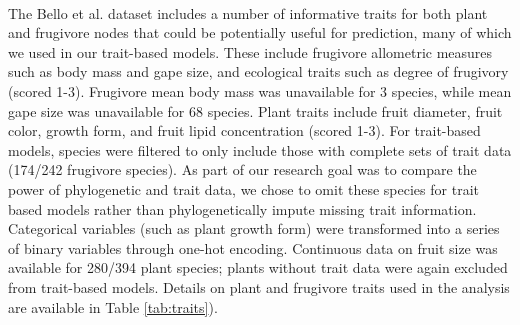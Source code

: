 \documentclass[num-refs]{article}%
\begin{document}
\paragraph*{}
The Bello et al. dataset includes a number of informative traits for both plant and frugivore nodes that could be potentially useful for prediction, many of which we used in our trait-based models. These include frugivore allometric measures such as body mass and gape size, and ecological traits such as degree of frugivory (scored 1-3). Frugivore mean body mass was unavailable for 3 species, while mean gape size was unavailable for 68 species. Plant traits include fruit diameter, fruit color, growth form, and fruit lipid concentration (scored 1-3). For trait-based models, species were filtered to only include those with complete sets of trait data (174/242 frugivore species). As part of our research goal was to compare the power of phylogenetic and trait data, we chose to omit these species for trait based models rather than phylogenetically impute missing trait information. Categorical variables (such as plant growth form) were transformed into a series of binary variables through one-hot encoding. Continuous data on fruit size was available for 280/394 plant species; plants without trait data were again excluded from trait-based models. Details on plant and frugivore traits used in the analysis are available in Table \ref{tab:traits}). 
\end{document}
